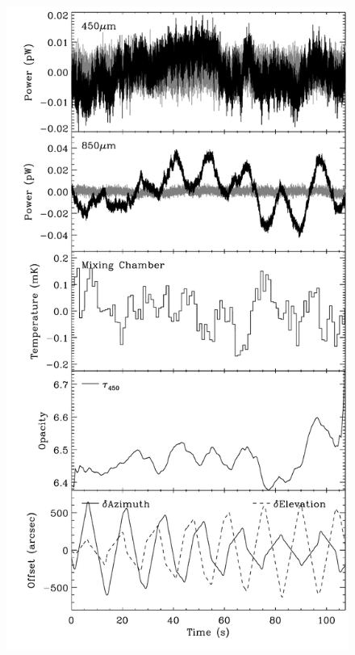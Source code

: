 \documentclass[useAMS,usenatbib,nofootinbib]{mn2e}
\begin{document}
\begin{figure}
\begin{minipage}[h]{0.495\linewidth}
\includegraphics[width=\linewidth]{bolos_point_mix}
\end{minipage}


\end{figure}
\end{document}
